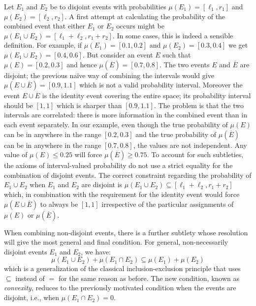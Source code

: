 \documentclass[english,reprint, aps, prl,superscriptaddress, showpacs,
showkeys, longbibliography, amsmath, amssymb]{revtex4-1}
\theoremstyle{plain}
\theoremstyle{definition}
\newcommand{\nb}{\nolinebreak[1] }
\begin{document}
Let $E_1$ and $E_2$ be to disjoint events with probabilities
$\mu(E_1)=[\ell_1,r_1]$ and $\mu(E_2)=[\ell_2,r_2]$. A first attempt
at calculating the probability of the combined event that either $E_1$
or $E_2$ occurs might be $\mu(E_1\cup E_2) = [\ell_1+\ell_2,r_1+r_2]$. In
some cases, this is indeed a sensible definition. For example, if
$\mu(E_1)=[0.1,0.2]$ and $\mu(E_2)=[0.3,0.4]$ we get
$\mu(E_1\cup E_2) = [0.4,0.6]$. But consider an event $E$ such that
$\mu(E)=[0.2,0.3]$ and hence $\mu(\overline{E})=[0.7,0.8]$. The two
events $E$ and $\overline{E}$ are disjoint; the previous naïve way
of combining the intervals would give $\mu(E\cup\overline{E})=[0.9,1.1]$
which is not a valid probability interval. Moreover the event
$E\cup\overline{E}$ is the identity event covering the entire space; its
probability interval should be $[1,1]$ which is sharper than
$[0.9,1.1]$. The problem is that the two intervals are correlated:
there is more information in the combined event than in each event
separately. In our example, even though the true probability of
$\mu(E)$ can be in anywhere in the range $[0.2,0.3]$ and the true
probability of $\mu(\overline{E})$ can be in anywhere in the range
$[0.7,0.8]$, the values are not independent. Any value of
$\mu(E) \leq 0.25$ will force $\mu(\overline{E})\geq 0.75$. To account
for such subtleties, the axioms of interval-valued probability do not
use a strict equality for the combination of disjoint events. The
correct constraint regarding the probability of $E_1\cup E_2$ when $E_1$
and $E_2$ are disjoint is
$\mu(E_1\cup E_2) \subseteq [\ell_1+\ell_2,r_1+r_2]$ which, in combination
with the requirement for the identity event would force
$\mu(E\cup\overline{E})$ to always be $[1,1]$ irrespective of the
particular assignments of $\mu(E)$ or $\mu(\overline{E})$. 

When combining non-disjoint events, there is a further subtlety whose
resolution will give the most general and final condition. For
general, non-necessarily disjoint events $E_1$ and $E_2$, we have:
\begin{equation}
\mu(E_1\cup E_2) + \mu(E_1\cap E_2) \subseteq \mu(E_1) + \mu(E_2)
\label{eq:classicalconvex}
\end{equation}
which is a generalization of the classical inclusion-exclusion
principle that uses $\subseteq$ instead of $=$ for the same reason as
before. The new condition, known as
\emph{convexity}\nb\cite{Shapley1971,GilboaSchmeidler1994,Marinacci1999,Grabisch2016},
reduces to the previously
motivated condition when the events are disjoint, i.e., when
$\mu(E_1\cap E_2) = 0$.
\end{document}
